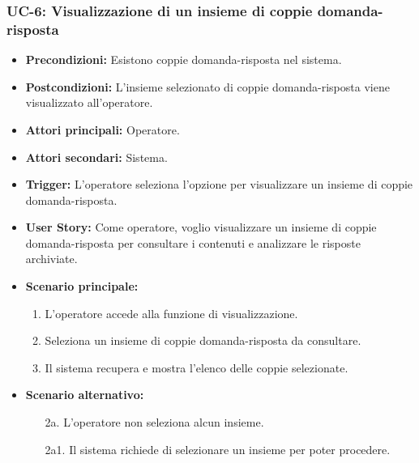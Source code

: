 \documentclass[a4paper, 12pt]{article}
\begin{document}
\subsubsection{UC-6: Visualizzazione di un insieme di coppie domanda-risposta}
\begin{itemize}
    \item \textbf{Precondizioni:} Esistono coppie domanda-risposta nel sistema.
    \item \textbf{Postcondizioni:} L'insieme selezionato di coppie domanda-risposta viene visualizzato all'operatore.
    \item \textbf{Attori principali:} Operatore.
    \item \textbf{Attori secondari:} Sistema.
    \item \textbf{Trigger:} L'operatore seleziona l'opzione per visualizzare un insieme di coppie domanda-risposta.
    \item \textbf{User Story:} Come operatore, voglio visualizzare un insieme di coppie domanda-risposta per consultare i contenuti e analizzare le risposte archiviate.
    \item \textbf{Scenario principale:}
    \begin{enumerate}
        \item L'operatore accede alla funzione di visualizzazione.
        \item Seleziona un insieme di coppie domanda-risposta da consultare.
        \item Il sistema recupera e mostra l'elenco delle coppie selezionate.
    \end{enumerate}
    \item \textbf{Scenario alternativo:}
    \begin{enumerate}
        \item[2a.] L'operatore non seleziona alcun insieme.
        \item[2a1.] Il sistema richiede di selezionare un insieme per poter procedere.
    \end{enumerate}
\end{itemize}
\end{document}
